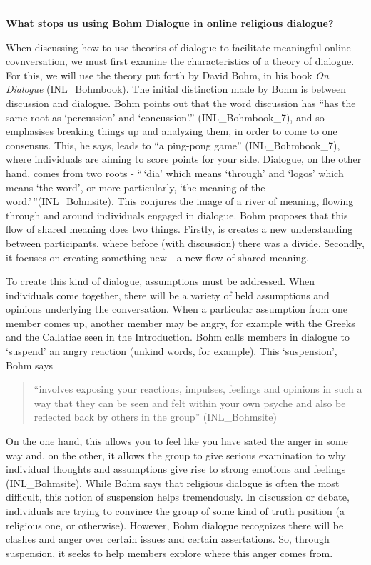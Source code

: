 \documentclass[]{article}
\begin{document}
\begin{center}\rule{0.5\linewidth}{\linethickness}\end{center}

\textbf{What stops us using Bohm Dialogue in online religious dialogue?}

When discussing how to use theories of dialogue to facilitate meaningful
online covnversation, we must first examine the characteristics of a
theory of dialogue. For this, we will use the theory put forth by David
Bohm, in his book \emph{On Dialogue} (INL\_Bohmbook). The initial
distinction made by Bohm is between discussion and dialogue. Bohm points
out that the word discussion has ``has the same root as `percussion' and
`concussion'.'' (INL\_Bohmbook\_7), and so emphasises breaking things up
and analyzing them, in order to come to one consensus. This, he says,
leads to ``a ping-pong game'' (INL\_Bohmbook\_7), where individuals are
aiming to score points for your side. Dialogue, on the other hand, comes
from two roots - ``\,`dia' which means `through' and `logos' which means
`the word', or more particularly, `the meaning of the
word.'\,''(INL\_Bohmsite). This conjures the image of a river of
meaning, flowing through and around individuals engaged in dialogue.
Bohm proposes that this flow of shared meaning does two things. Firstly,
is creates a new understanding between participants, where before (with
discussion) there was a divide. Secondly, it focuses on creating
something new - a new flow of shared meaning.

To create this kind of dialogue, assumptions must be addressed. When
individuals come together, there will be a variety of held assumptions
and opinions underlying the conversation. When a particular assumption
from one member comes up, another member may be angry, for example with
the Greeks and the Callatiae seen in the Introduction. Bohm calls
members in dialogue to `suspend' an angry reaction (unkind words, for
example). This `suspension', Bohm says

\begin{quote}
``involves exposing your reactions, impulses, feelings and opinions in
such a way that they can be seen and felt within your own psyche and
also be reflected back by others in the group'' (INL\_Bohmsite)
\end{quote}

On the one hand, this allows you to feel like you have sated the anger
in some way and, on the other, it allows the group to give serious
examination to why individual thoughts and assumptions give rise to
strong emotions and feelings (INL\_Bohmsite). While Bohm says that
religious dialogue is often the most difficult, this notion of
suspension helps tremendously. In discussion or debate, individuals are
trying to convince the group of some kind of truth position (a religious
one, or otherwise). However, Bohm dialogue recognizes there will be
clashes and anger over certain issues and certain assertations. So,
through suspension, it seeks to help members explore where this anger
comes from.
\end{document}
